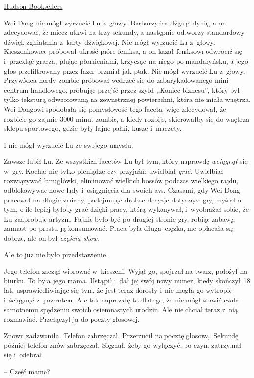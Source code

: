 \documentclass[oneside,polish,11pt,rmheadings]{mwbk}
\begin{document}
\href{https://www.hudsongroup.com/}{Hudson Booksellers}

Wei-Dong nie mógł wyrzucić Lu z~głowy. Barbarzyńca dźgnął dynię, a on zdecydował, że miecz utkwi na trzy sekundy, a następnie odtworzy standardowy dźwięk zgniatania z~karty dźwiękowej. Nie mógł wyrzucić Lu z~głowy. Kieszonkowiec próbował ukraść pióro feniksa, a on kazał feniksowi odwrócić się i~przekląć gracza, plując płomieniami, krzycząc na niego po mandaryńsku, a jego głos przefiltrowany przez fazer brzmiał jak ptak. Nie mógł wyrzucić Lu z~głowy. Przywódca hordy zombie próbował wedrzeć się do zabarykadowanego mini-centrum handlowego, próbując przejść przez szyld ,,Koniec biznesu'', który był tylko teksturą odwzorowaną na zewnętrznej powierzchni, która nie miała wnętrza. Wei-Dongowi spodobała się pomysłowość tego faceta, więc zdecydował, że rozbicie go zajmie 3000 minut zombie, a kiedy rozbije, skierowałby się do wnętrza sklepu sportowego, gdzie były fajne pałki, kusze i~maczety.

I nie mógł wyrzucić Lu ze swojego umysłu.

Zawsze lubił Lu. Ze wszystkich facetów Lu był tym, który naprawdę \textit{wciągnął} się w~gry. Kochał nie tylko pieniądze czy przyjaźń: uwielbiał \textit{grać}. Uwielbiał rozwiązywać łamigłówki, eliminować wielkich bossów podczas wielkiego rajdu, odblokowywać nowe lądy i~osiągnięcia dla swoich avs. Czasami, gdy Wei-Dong pracował na długie zmiany, podejmując drobne decyzje dotyczące gry, myślał o tym, o ile lepiej byłoby grać dzięki pracy, którą wykonywał, i~wyobrażał sobie, że Lu zaaprobuje artyzm. Fajnie było być po drugiej stronie gry, robiąc zabawę, zamiast po prostu ją konsumować. Praca była długa, ciężka, nie opłacała się dobrze, ale on był \textit{częścią show}.

Ale to już nie było przedstawienie.

Jego telefon zaczął wibrować w~kieszeni. Wyjął go, spojrzał na twarz, położył na biurku. To była jego mama. Ustąpił i~dał jej swój nowy numer, kiedy skończył 18 lat, usprawiedliwiając się tym, że jest teraz dorosły i~nie mogła go wytropić i~ściągnąć z~powrotem. Ale tak naprawdę to dlatego, że nie mógł stawić czoła samotnemu spędzeniu swoich osiemnastych urodzin. Ale nie chciał teraz z~nią rozmawiać. Przełączył ją do poczty głosowej.

Znowu zadzwoniła. Telefon zabrzęczał. Przerzucił na pocztę głosową. Sekundę później telefon znów zabrzęczał. Sięgnął, żeby go wyłączyć, po czym zatrzymał się i~odebrał.

-- Cześć mamo? 
\end{document}
